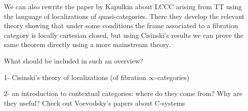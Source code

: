 \documentclass[a4paper,12pt,openany]{scrartcl}
\begin{document}
We can also rewrite the paper by Kapulkin about LCCC arising from TT using the language of localizations of quasi-categories. There they develop the relevant theory showing that under some conditions the frame associated to a fibration category is locally cartesian closed, but using Cisinski's results we can prove the same theorem directly using a more mainstream theory.

What should be included in such an overview?

1- Cisinski's theory of localizations (of fibration $\infty$-categories)

2- an introduction to contextual categories: where do they come from? Why are they useful? Check out Voevodsky's papers about C-systems

\printbibliography
\end{document}
